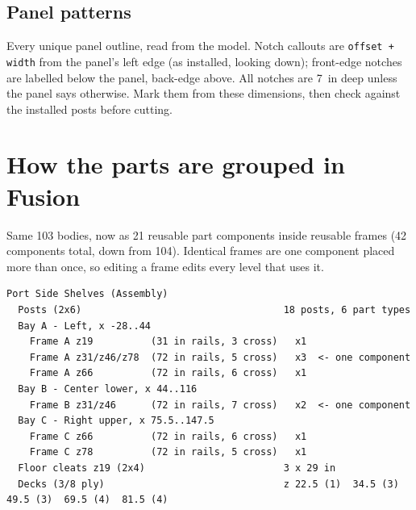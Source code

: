 \documentclass[10pt,letterpaper]{article}
\newcommand{\cutdim}[1]{\texttt{#1}}
\begin{document}
\subsection*{Panel patterns}
Every unique panel outline, read from the model. Notch callouts are \cutdim{offset + width} from the panel's left edge (as installed, looking down); front-edge notches are labelled below the panel, back-edge above. All notches are 7~in deep unless the panel says otherwise. Mark them from these dimensions, then check against the installed posts before cutting.

\noindent


\section*{How the parts are grouped in Fusion}
Same 103 bodies, now as 21 reusable part components inside reusable frames (42 components total, down from 104). Identical frames are one component placed more than once, so editing a frame edits every level that uses it.

{\small\begin{verbatim}
Port Side Shelves (Assembly)
  Posts (2x6)                                   18 posts, 6 part types
  Bay A - Left, x -28..44
    Frame A z19          (31 in rails, 3 cross)   x1
    Frame A z31/z46/z78  (72 in rails, 5 cross)   x3  <- one component
    Frame A z66          (72 in rails, 6 cross)   x1
  Bay B - Center lower, x 44..116
    Frame B z31/z46      (72 in rails, 7 cross)   x2  <- one component
  Bay C - Right upper, x 75.5..147.5
    Frame C z66          (72 in rails, 6 cross)   x1
    Frame C z78          (72 in rails, 5 cross)   x1
  Floor cleats z19 (2x4)                        3 x 29 in
  Decks (3/8 ply)                               z 22.5 (1)  34.5 (3)  49.5 (3)  69.5 (4)  81.5 (4)
\end{verbatim}}
\end{document}
